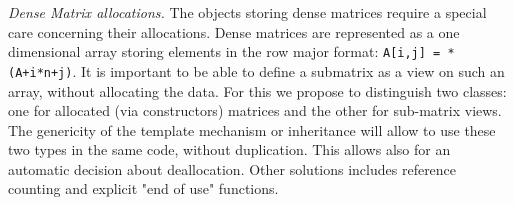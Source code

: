 \documentclass{article}
\begin{document}
\begin{paragraph}
{\em Dense Matrix allocations.}
The objects storing dense matrices require a special care
concerning their allocations. Dense matrices are represented as a one
dimensional array storing elements in the row major format:
\texttt{A[i,j] = *(A+i*n+j)}.  It is important to be 
able to define a submatrix as a view on such an array, without
allocating the data.
For this we propose to distinguish two classes: one for allocated (via
constructors) matrices and the other for sub-matrix views. The 
genericity of  the template mechanism or inheritance will allow to use
these two types in the same code, without duplication. This allows
also for an automatic decision about deallocation.
Other solutions includes reference counting and explicit "end of use"
functions.



\end{paragraph}
\end{document}
